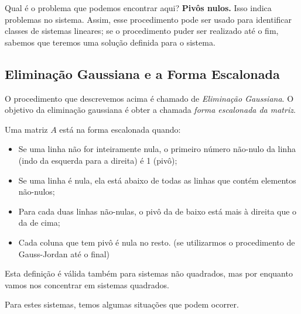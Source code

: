 Qual é o problema que podemos encontrar aqui? {\bf{Pivôs nulos.}} Isso indica problemas no sistema. Assim, esse procedimento pode ser usado para identificar classes de sistemas lineares; se o procedimento puder ser realizado até o fim, sabemos que teremos uma solução definida para o sistema.

\subsection{Eliminação Gaussiana e a Forma Escalonada}

O procedimento que descrevemos acima é chamado de \emph{Eliminação Gaussiana}. O objetivo da eliminação gaussiana é obter a chamada \emph{forma escalonada da
matriz}. 

\begin{defi}
   Uma matriz $A$ está na forma escalonada quando:
   \begin{itemize}
      \item Se uma linha não for inteiramente nula, o primeiro número não-nulo da linha (indo da esquerda para a direita) é 1 (pivô);
		\item Se uma linha é nula, ela está abaixo de todas as linhas que contém elementos não-nulos;
		\item Para cada duas linhas não-nulas, o pivô da de baixo está mais à direita que o da de cima;
		\item Cada coluna que tem pivô é nula no resto. (se utilizarmos o procedimento de Gauss-Jordan até o final)
   \end{itemize}
\end{defi}

Esta definição é válida também para sistemas não quadrados, mas por enquanto vamos nos concentrar em sistemas quadrados. 

Para estes sistemas, temos algumas situações que podem ocorrer.

